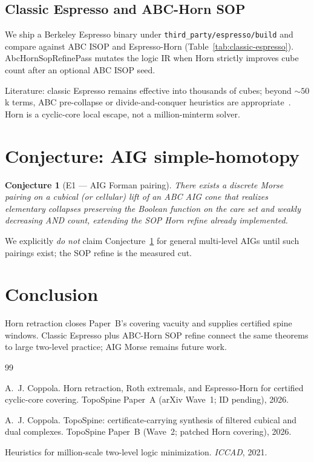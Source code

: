 \documentclass[11pt]{article}
\newtheorem{conjecture}{Conjecture}
\begin{document}


\subsection{Classic Espresso and ABC-Horn SOP}
We ship a Berkeley Espresso binary under \texttt{third\_party/espresso/build}
and compare against ABC ISOP and Espresso-Horn (Table~\ref{tab:classic-espresso}).
\textsf{AbcHornSopRefinePass} mutates the logic IR when Horn strictly improves
cube count after an optional ABC ISOP seed.



Literature: classic Espresso remains effective into thousands of cubes;
beyond $\sim 50$k terms, ABC pre-collapse or divide-and-conquer heuristics are
appropriate~\cite{iccad2021million}.  Horn is a cyclic-core local escape, not a
million-minterm solver.

\section{Conjecture: AIG simple-homotopy}
\label{sec:conjecture}

\begin{conjecture}[E1 --- AIG Forman pairing]
\label{conj:e1}
There exists a discrete Morse pairing on a cubical (or cellular) lift of an ABC
AIG cone that realizes elementary collapses preserving the Boolean function on
the care set and weakly decreasing AND count, extending the SOP Horn refine
already implemented.
\end{conjecture}

\noindent We explicitly \emph{do not} claim Conjecture~\ref{conj:e1} for general
multi-level AIGs until such pairings exist; the SOP refine is the measured cut.

\section{Conclusion}
Horn retraction closes Paper~B's covering vacuity and supplies certified spine
windows.  Classic Espresso plus ABC-Horn SOP refine connect the same theorems to
large two-level practice; AIG Morse remains future work.


\begin{thebibliography}{99}

A.~J. Coppola.
\newblock Horn retraction, Roth extremals, and Espresso-Horn for certified
cyclic-core covering.
\newblock TopoSpine Paper~A (arXiv Wave~1; ID pending), 2026.

A.~J. Coppola.
\newblock TopoSpine: certificate-carrying synthesis of filtered cubical and dual
complexes.
\newblock TopoSpine Paper~B (Wave~2; patched Horn covering), 2026.

Heuristics for million-scale two-level logic minimization.
\newblock \emph{ICCAD}, 2021.

\end{thebibliography}
\end{document}
